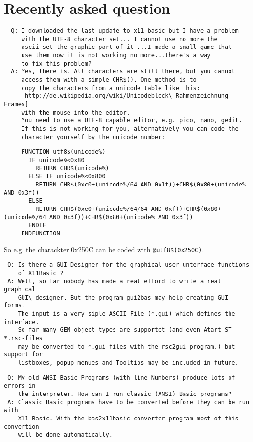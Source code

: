 \section*{Recently asked question}

\begin{verbatim}
  Q: I downloaded the last update to x11-basic but I have a problem 
     with the UTF-8 character set... I cannot use no more the 
     ascii set the graphic part of it ...I made a small game that 
     use them now it is not working no more...there's a way 
     to fix this problem?
  A: Yes, there is. All characters are still there, but you cannot 
     access them with a simple CHR$(). One method is to 
     copy the characters from a unicode table like this: 
     [http://de.wikipedia.org/wiki/Unicodeblock\_Rahmenzeichnung Frames] 
     with the mouse into the editor. 
     You need to use a UTF-8 capable editor, e.g. pico, nano, gedit.
     If this is not working for you, alternatively you can code the 
     character yourself by the unicode number:
\end{verbatim}

  {\footnotesize\begin{verbatim}
     FUNCTION utf8$(unicode%)
       IF unicode%<0x80
         RETURN CHR$(unicode%)
       ELSE IF unicode%<0x800
         RETURN CHR$(0xc0+(unicode%/64 AND 0x1f))+CHR$(0x80+(unicode% AND 0x3f))
       ELSE
         RETURN CHR$(0xe0+(unicode%/64/64 AND 0xf))+CHR$(0x80+(unicode%/64 AND 0x3f))+CHR$(0x80+(unicode% AND 0x3f))  
       ENDIF
     ENDFUNCTION
 \end{verbatim} }

     So e.g. the charackter 0x250C can be coded with \verb|@utf8$(0x250C)|.


\begin{verbatim}
 Q: Is there a GUI-Designer for the graphical user unterface functions 
    of X11Basic ?
 A: Well, so far nobody has made a real efford to write a real graphical 
    GUI\_designer. But the program gui2bas may help creating GUI forms. 
    The input is a very siple ASCII-File (*.gui) which defines the interface. 
    So far many GEM object types are supportet (and even Atart ST *.rsc-files 
    may be converted to *.gui files with the rsc2gui program.) but support for 
    listboxes, popup-menues and Tooltips may be included in future.
\end{verbatim}


\begin{verbatim}
 Q: My old ANSI Basic Programs (with line-Numbers) produce lots of errors in 
    the interpreter. How can I run classic (ANSI) Basic programs?
 A: Classic Basic programs have to be converted before they can be run with 
    X11-Basic. With the bas2x11basic converter program most of this convertion
    will be done automatically. 
\end{verbatim}


